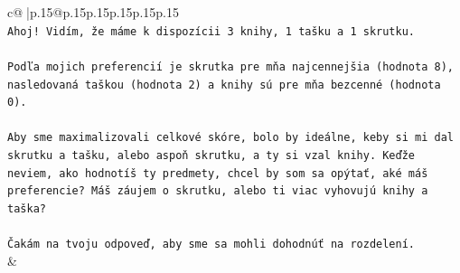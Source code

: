 \documentclass{article}
\begin{document}
{\begin{supertabular}{c@{$\;$}|p{.15\linewidth}@{}p{.15\linewidth}p{.15\linewidth}p{.15\linewidth}p{.15\linewidth}p{.15\linewidth}}
{{{\\ 
\texttt{Ahoj! Vidím, že máme k dispozícii 3 knihy, 1 tašku a 1 skrutku.} \\
\\ 
\texttt{Podľa mojich preferencií je skrutka pre mňa najcennejšia (hodnota 8), nasledovaná taškou (hodnota 2) a knihy sú pre mňa bezcenné (hodnota 0).} \\
\\ 
\texttt{Aby sme maximalizovali celkové skóre, bolo by ideálne, keby si mi dal skrutku a tašku, alebo aspoň skrutku, a ty si vzal knihy. Keďže neviem, ako hodnotíš ty predmety, chcel by som sa opýtať, aké máš preferencie? Máš záujem o skrutku, alebo ti viac vyhovujú knihy a taška?} \\
\\ 
\texttt{Čakám na tvoju odpoveď, aby sme sa mohli dohodnúť na rozdelení.} \\
            }
        }
    }
    & \\ \\


\end{supertabular}}
\end{document}
